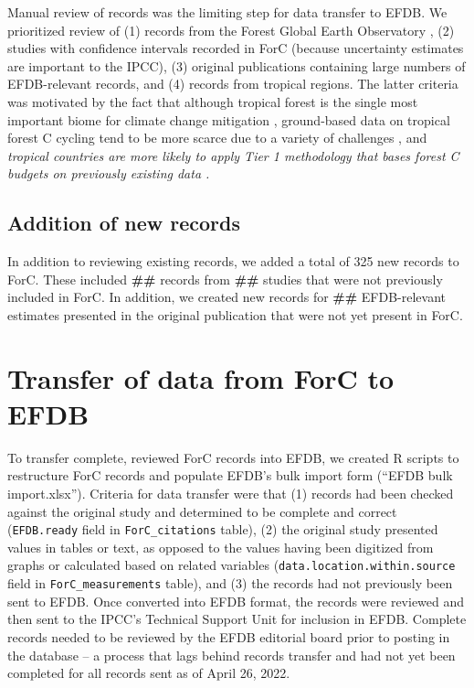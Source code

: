 \documentclass[, manuscript]{copernicus}
\begin{document}
Manual review of records was the limiting step for data transfer to
EFDB. We prioritized review of (1) records from the Forest Global Earth
Observatory
\citep[ForestGEO,][]{anderson-teixeira_ctfsforestgeo_2015, davies_forestgeo_2021},
(2) studies with confidence intervals recorded in ForC (because
uncertainty estimates are important to the IPCC), (3) original
publications containing large numbers of EFDB-relevant records, and (4)
records from tropical regions. The latter criteria was motivated by the
fact that although tropical forest is the single most important biome
for climate change mitigation \citep{refs}, ground-based data on
tropical forest C cycling tend to be more scarce due to a variety of
challenges \citep{delima_making_2022}, and \emph{tropical countries are
more likely to apply Tier 1 methodology that bases forest C budgets on
previously existing data \citep{ref}.}

\subsection{Addition of new records}

In addition to reviewing existing records, we added a total of 325 new
records to ForC. These included \textbf{\#\#} records from \textbf{\#\#}
studies \citep{piponiot_distribution_2022, refs} that were not
previously included in ForC. In addition, we created new records for
\textbf{\#\#} EFDB-relevant estimates presented in the original
publication that were not yet present in ForC.

\section{Transfer of data from ForC to EFDB}

To transfer complete, reviewed ForC records into EFDB, we created R
scripts to restructure ForC records and populate EFDB's bulk import form
(``EFDB bulk import.xlsx''). Criteria for data transfer were that (1)
records had been checked against the original study and determined to be
complete and correct (\texttt{EFDB.ready} field in
\texttt{ForC\_citations} table), (2) the original study presented values
in tables or text, as opposed to the values having been digitized from
graphs or calculated based on related variables
(\texttt{data.location.within.source} field in
\texttt{ForC\_measurements} table), and (3) the records had not
previously been sent to EFDB. Once converted into EFDB format, the
records were reviewed and then sent to the IPCC's Technical Support Unit
for inclusion in EFDB. Complete records needed to be reviewed by the
EFDB editorial board prior to posting in the database -- a process that
lags behind records transfer and had not yet been completed for all
records sent as of April 26, 2022.
\end{document}
